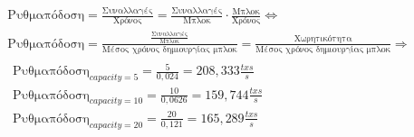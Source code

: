 \documentclass{article}
\newcommand{\eng}[1]{\foreignlanguage{english}{#1}} %
\begin{document}
\begin{equation}
    \begin{gathered}
        \text{Ρυθμαπόδοση} = \frac{\text{Συναλλαγές}}{\text{Χρόνος}} = \frac{\text{Συναλλαγές}}{\text{Μπλοκ}}\cdot \frac{\text{Μπλοκ}}{\text{Χρόνος}} \Leftrightarrow \\
        \text{Ρυθμαπόδοση} = \frac{\frac{\text{Συναλλαγές}}{\text{Μπλοκ}} }{\text{Μέσος χρόνος δημιουργίας μπλοκ}} = \frac{\text{Χωρητικότητα}}{\text{Μέσος χρόνος δημιουργίας μπλοκ}} \Rightarrow \\
    \boxed{
        \begin{gathered}
            \text{Ρυθμαπόδοση}_{capacity=5} = \frac{5}{0,024} = 208,333\text{} \frac{txs}{s}\\
            \text{Ρυθμαπόδοση}_{capacity=10} = \frac{10}{0,0626} = 159,744\text{} \frac{txs}{s}\\
            \text{Ρυθμαπόδοση}_{capacity=20} = \frac{20}{0,121} = 165,289\text{} \frac{txs}{s}\\
        \end{gathered}
    }
    \end{gathered}
\end{equation}

% 
%             
%             
%             
\end{document}

